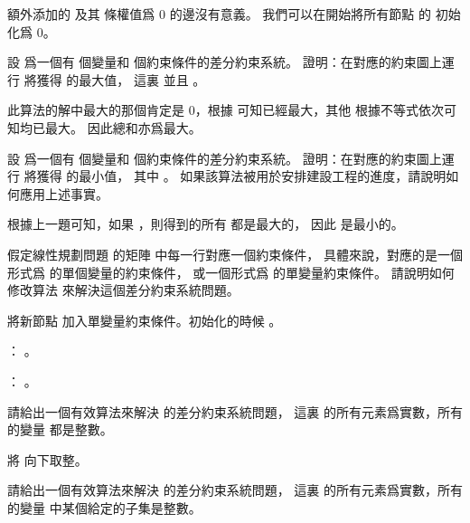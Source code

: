 \startANSWER
額外添加的  及其  條權值爲 0 的邊沒有意義。
我們可以在開始將所有節點  的  初始化爲 0。
\stopANSWER

\startEXERCISE\DIFFICULT
設  爲一個有  個變量和  個約束條件的差分約束系統。
證明：在對應的約束圖上運行  將獲得  的最大值，
這裏  並且 。
\stopEXERCISE

\startANSWER
此算法的解中最大的那個肯定是 0，根據  可知已經最大，其他  根據不等式依次可知均已最大。
因此總和亦爲最大。
\stopANSWER

\startEXERCISE\DIFFICULT
設  爲一個有  個變量和  個約束條件的差分約束系統。
證明：在對應的約束圖上運行  將獲得  的最小值，
其中 。
如果該算法被用於安排建設工程的進度，請說明如何應用上述事實。
\stopEXERCISE

\startANSWER
根據上一題可知，如果 ，則得到的所有  都是最大的，
因此  是最小的。
\stopANSWER

\startEXERCISE
假定線性規劃問題  的矩陣  中每一行對應一個約束條件，
具體來說，對應的是一個形式爲  的單個變量的約束條件，
或一個形式爲  的單變量約束條件。
請說明如何修改算法  來解決這個差分約束系統問題。
\stopEXERCISE

\startANSWER
將新節點  加入單變量約束條件。初始化的時候 。

： 。

： 。
\stopANSWER

\startEXERCISE
請給出一個有效算法來解決  的差分約束系統問題，
這裏  的所有元素爲實數，所有的變量  都是整數。
\stopEXERCISE

\startANSWER
將  向下取整。
\stopANSWER

\startEXERCISE\DIFFICULT
請給出一個有效算法來解決  的差分約束系統問題，
這裏  的所有元素爲實數，所有的變量  中某個給定的子集是整數。
\stopEXERCISE

\startANSWER
{}
\stopANSWER

\stopsection
